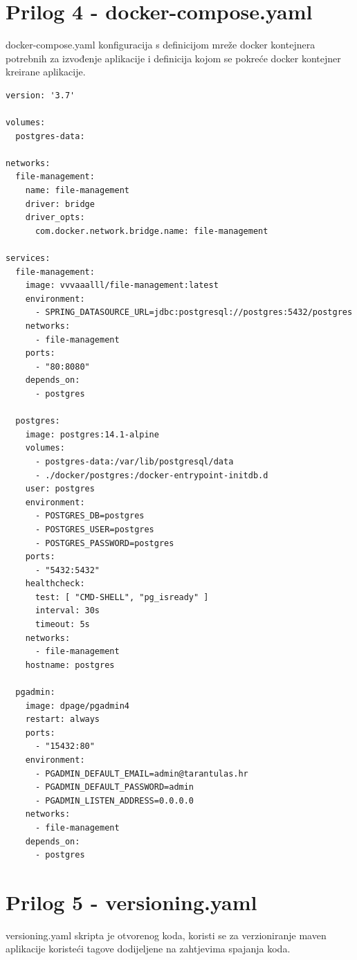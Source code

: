 \documentclass[a4paper,12pt,oneside]{article}
\begin{document}
\section*{Prilog 4 - docker-compose.yaml}
\label{prilog 4}
docker-compose.yaml konfiguracija s definicijom mreže docker kontejnera potrebnih za izvođenje aplikacije i definicija kojom se pokreće docker kontejner kreirane aplikacije.
\begin{lstlisting}
version: '3.7'

volumes:
  postgres-data:

networks:
  file-management:
    name: file-management
    driver: bridge
    driver_opts:
      com.docker.network.bridge.name: file-management

services:
  file-management:
    image: vvvaaalll/file-management:latest
    environment:
      - SPRING_DATASOURCE_URL=jdbc:postgresql://postgres:5432/postgres
    networks:
      - file-management
    ports:
      - "80:8080"
    depends_on:
      - postgres

  postgres:
    image: postgres:14.1-alpine
    volumes:
      - postgres-data:/var/lib/postgresql/data
      - ./docker/postgres:/docker-entrypoint-initdb.d
    user: postgres
    environment:
      - POSTGRES_DB=postgres
      - POSTGRES_USER=postgres
      - POSTGRES_PASSWORD=postgres
    ports:
      - "5432:5432"
    healthcheck:
      test: [ "CMD-SHELL", "pg_isready" ]
      interval: 30s
      timeout: 5s
    networks:
      - file-management
    hostname: postgres

  pgadmin:
    image: dpage/pgadmin4
    restart: always
    ports:
      - "15432:80"
    environment:
      - PGADMIN_DEFAULT_EMAIL=admin@tarantulas.hr
      - PGADMIN_DEFAULT_PASSWORD=admin
      - PGADMIN_LISTEN_ADDRESS=0.0.0.0
    networks:
      - file-management
    depends_on:
      - postgres

\end{lstlisting}

\newpage
\section*{Prilog 5 - versioning.yaml}
\label{prilog 5}
versioning.yaml skripta je otvorenog koda, koristi se za verzioniranje maven aplikacije koristeći tagove dodijeljene na zahtjevima spajanja koda.
\end{document}

